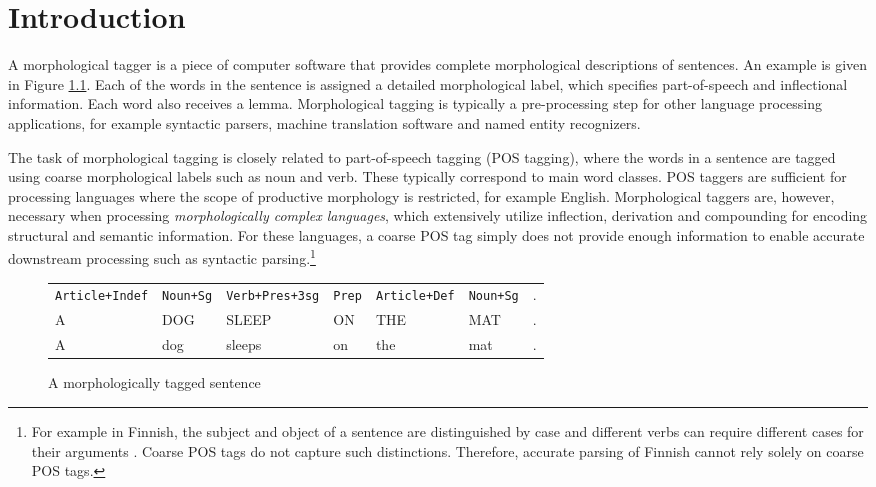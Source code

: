 \chapter{Introduction}
\label{ch:intro}

A morphological tagger is a piece of computer software that provides
complete morphological descriptions of sentences. An example is given
in Figure \ref{fig:mt-example}. Each of the words in the sentence is
assigned a detailed morphological label, which specifies
part-of-speech and inflectional information. Each word also receives a
lemma. Morphological tagging is typically a pre-processing step for
other language processing applications, for example syntactic parsers,
machine translation software and named entity recognizers.

The task of morphological tagging is closely related to part-of-speech
tagging (POS tagging), where the words in a sentence are tagged using
coarse morphological labels such as noun and verb. These typically
correspond to main word classes. POS taggers are sufficient for
processing languages where the scope of productive morphology is
restricted, for example English. Morphological taggers are, however,
necessary when processing {\it morphologically complex languages}, which
extensively utilize inflection, derivation and compounding for
encoding structural and semantic information. For these languages, a
coarse POS tag simply does not provide enough information to enable
accurate downstream processing such as syntactic parsing.\footnote{For
  example in Finnish, the subject and object of a sentence are
  distinguished by case and different verbs can require different
  cases for their arguments \cite{Hakulinen2004}. Coarse POS tags do
  not capture such distinctions. Therefore, accurate parsing of
  Finnish cannot rely solely on coarse POS tags.}

\begin{figure}[!htb]
\begin{center}
\begin{tabular}{|l|l|l|l|l|l|l|}
\hline
{\small\texttt{Article+Indef}} & {\small\texttt{Noun+Sg}} & {\small\texttt{Verb+Pres+3sg}} & {\small\texttt{Prep}} & {\small\texttt{Article+Def}} & {\small\texttt{Noun+Sg}} & .\\  
{\small\uppercase{a}} & {\small\uppercase{dog}} & {\small\uppercase{sleep}} & {\small\uppercase{on}} & {\small\uppercase{the}} & {\small\uppercase{mat}} & {\small\uppercase{.}}\\
\hline
A & dog & sleeps & on & the & mat & .\\
\hline
\end{tabular}
\end{center}
\caption{A morphologically tagged sentence}\label{fig:mt-example}
\end{figure}

